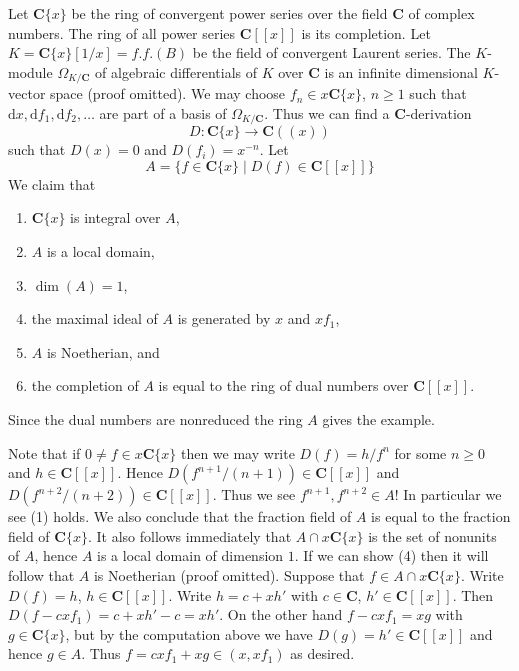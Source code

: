 \medskip\noindent
Let $\mathbf{C}\{x\}$ be the ring of convergent power series over
the field $\mathbf{C}$ of complex numbers. The ring of all power series
$\mathbf{C}[[x]]$ is its completion. Let $K = \mathbf{C}\{x\}[1/x] = f.f.(B)$
be the field of convergent Laurent series. The $K$-module
$\Omega_{K/\mathbf{C}}$ of algebraic differentials
of $K$ over $\mathbf{C}$ is an infinite dimensional $K$-vector space
(proof omitted). We may choose $f_n \in x\mathbf{C}\{x\}$,
$n \geq 1$ such that
$
\text{d}x, \text{d}f_1, \text{d}f_2, \ldots
$
are part of a basis of $\Omega_{K/\mathbf{C}}$. Thus we can
find a $\mathbf{C}$-derivation
$$
D : \mathbf{C}\{x\} \longrightarrow \mathbf{C}((x))
$$
such that $D(x) = 0$ and $D(f_i) = x^{-n}$. Let
$$
A = \{f \in \mathbf{C}\{x\} \mid D(f) \in \mathbf{C}[[x]]\}
$$
We claim that
\begin{enumerate}
\item $\mathbf{C}\{x\}$ is integral over $A$,
\item $A$ is a local domain,
\item $\dim(A) = 1$,
\item the maximal ideal of $A$ is generated by $x$ and $xf_1$,
\item $A$ is Noetherian, and
\item the completion of $A$ is equal to the ring of dual numbers
over $\mathbf{C}[[x]]$.
\end{enumerate}
Since the dual numbers are nonreduced the ring $A$ gives the example.

\medskip\noindent
Note that if $0 \not = f \in x\mathbf{C}\{x\}$ then
we may write $D(f) = h/f^n$ for some $n \geq 0$ and $h \in \mathbf{C}[[x]]$.
Hence $D(f^{n + 1}/(n + 1)) \in \mathbf{C}[[x]]$
and $D(f^{n + 2}/(n + 2)) \in \mathbf{C}[[x]]$. Thus we
see $f^{n + 1}, f^{n + 2} \in A$!
In particular we see (1) holds. We also conclude that
the fraction field of $A$ is equal to the fraction field of
$\mathbf{C}\{x\}$. It also follows immediately that
$A \cap x\mathbf{C}\{x\}$ is the set of nonunits of $A$, hence
$A$ is a local domain of dimension $1$. If we can show (4)
then it will follow that $A$ is Noetherian (proof omitted).
Suppose that $f \in A \cap x\mathbf{C}\{x\}$. Write
$D(f) = h$, $h \in \mathbf{C}[[x]]$. Write $h = c + xh'$
with $c \in \mathbf{C}$, $h' \in \mathbf{C}[[x]]$. Then
$D(f - cxf_1) = c + xh' - c = xh'$. On the other hand
$f - cxf_1 = xg$ with $g \in \mathbf{C}\{x\}$, but by the
computation above we have $D(g) = h' \in \mathbf{C}[[x]]$
and hence $g \in A$. Thus $f = cxf_1 + xg \in (x, xf_1)$ as desired.

